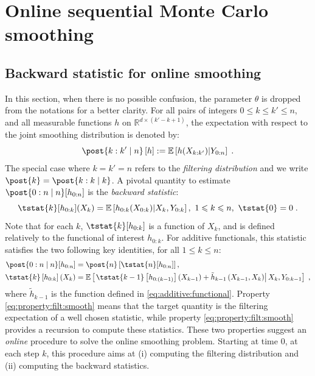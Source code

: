 \documentclass[12pt]{article}
\newcommand{\parvec}{\theta}
\newcommand{\af}[1]{h_{#1}}
\newcommand{\addf}[1]{\termletter_{#1}}
\newcommand{\termletter}{\tilde{h}}
\def\pE{\mathbb{E}}
\newcommand{\rset}{\ensuremath{\mathbb{R}}}
\newcommand{\eqsp}{\;}
\begin{document}
\section{Online sequential Monte Carlo smoothing}
\label{sec:method}

\subsection{Backward statistic for online smoothing}

In this section, when there is no possible confusion, the parameter $\parvec$ is dropped from the notations for a better clarity. For all pairs of integers $0\leqslant k \leqslant k' \leqslant n$, and all measurable functions $h$ on $\rset^{d \times (k' - k + 1)}$, the expectation with respect to the joint smoothing distribution is denoted by:
$$
\post{k:k' \mid n} \left[ h \right] := \pE\left[ h(X_{k:k'}) \middle | Y_{0:n} \right]\eqsp .
$$
The special case where $k = k' = n$ refers to the \textit{filtering distribution} and we write $\post{k} = \post{k:k \mid k}$.
A pivotal quantity to estimate $\post{0:n \mid n}[\af{0:n}]$ is the \textit{backward statistic}:
\begin{equation}
\label{eq:T:stat}
\tstat{k}[\af{0:k}](X_k) = \pE \left[\af{0:k}(X_{0:k        }) \middle | X_k, Y_{0:k}\right],~1\leqslant k \leqslant n,~\tstat{0} = 0\eqsp.
\end{equation}
Note that for each $k$, $\tstat{k}[\af{0:k}]$ is a function of $X_k$, and is defined relatively to the functional of interest $\af{0:k}$.
For additive functionals, this statistic satisfies the two following key identities, for all $1\leqslant k \leqslant n$:
\begin{align}
\post{0:n \mid n}[\af{0:n}] &= \post{n}\left[\tstat{n}[\af{0:n}] \right], \label{eq:property:filt:smooth}\\
\tstat{k}\left[\af{0:k}\right](X_{k}) &= \pE\left[\left.\tstat{k-1}\left[\af{0:(k-1)}\right]\left(X_{k-1}\right) + \addf{k-1}\left(X_{k-1},X_{k}\right)\right|X_{k},Y_{0:k-1} \right]\eqsp, \label{eq:property:backward}
\end{align} 
where $\addf{k-1}$ is the function defined in \eqref{eq:additive:functional}.
Property \eqref{eq:property:filt:smooth} means that the target quantity is the filtering expectation of a well chosen statistic, while property \eqref{eq:property:filt:smooth} provides a recursion to compute these statistics. 
These two properties suggest an \textit{online} procedure to solve the online smoothing problem. Starting at time 0, at each step $k$, this procedure aims at (i) computing the filtering distribution and (ii) computing the backward statistics. 
\end{document}
